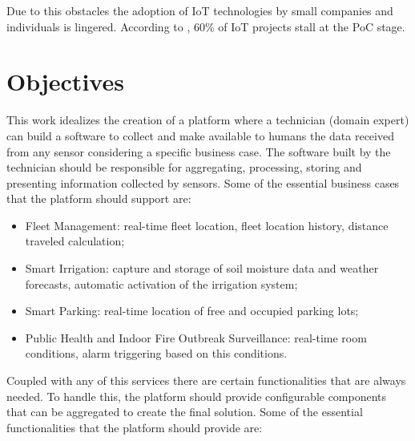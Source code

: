 Due to this obstacles the adoption of \gls{IoT} technologies by small companies and individuals is lingered. According to \cite{iot-fail}, 60\% of \gls{IoT} projects stall at the \gls{PoC} stage.

\section{Objectives}
\label{sec:introduction:objectives}

This work idealizes the creation of a platform where a technician (domain expert) can build a software to collect and make available to humans the data received from any sensor considering a specific business case. The software built by the technician should be responsible for aggregating, processing, storing and presenting information collected by sensors. Some of the essential business cases that the platform should support are:

\begin{itemize}
    \item Fleet Management: real-time fleet location, fleet location history, distance traveled calculation; 
    \item Smart Irrigation: capture and storage of soil moisture data and weather forecasts, automatic activation of the irrigation system;
    \item Smart Parking: real-time location of free and occupied parking lots;
    \item Public Health and Indoor Fire Outbreak Surveillance: real-time room conditions, alarm triggering based on this conditions.
\end{itemize}

Coupled with any of this services there are certain functionalities that are always needed. To handle this, the platform should provide configurable components that can be aggregated to create the final solution.
Some of the essential functionalities that the platform should provide are:

